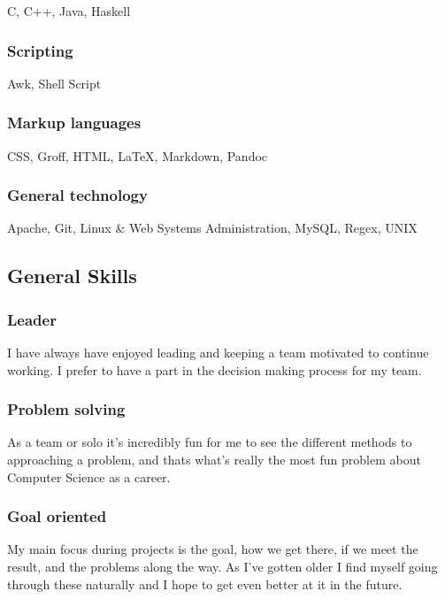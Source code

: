 \documentclass{article}
\begin{document}
C, C++, Java, Haskell

\subsubsection{Scripting}

Awk, Shell Script

\subsubsection{Markup languages}

CSS, Groff, HTML, {\LaTeX}, Markdown, Pandoc

\subsubsection{General technology}

Apache, Git, Linux \& Web Systems Administration, MySQL, Regex, UNIX

\subsection{General Skills}

\subsubsection{Leader}

I have always have enjoyed leading and keeping a team motivated to continue working. I prefer to have a part in the decision making process for my team.

\subsubsection{Problem solving}

As a team or solo it's incredibly fun for me to see the different methods to approaching a problem, and thats what's really the most fun problem about Computer Science as a career.

\subsubsection{Goal oriented}

My main focus during projects is the goal, how we get there, if we meet the result, and the problems along the way. As I've gotten older I find myself going through these naturally and I hope to get even better at it in the future.
\end{document}
